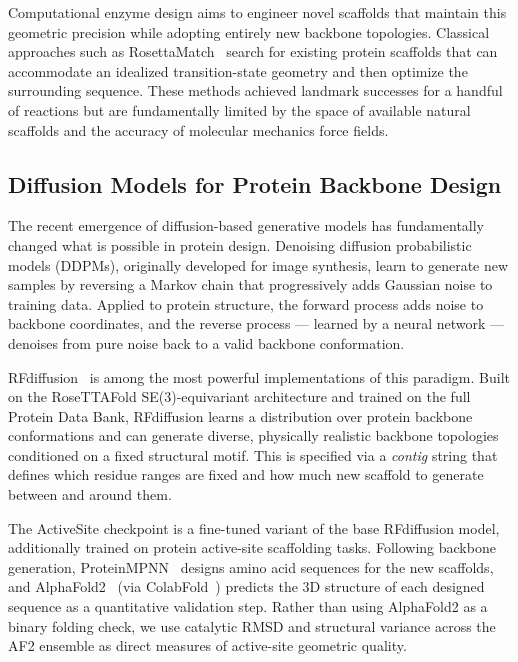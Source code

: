 \documentclass[11pt,letterpaper]{article}
\begin{document}
Computational enzyme design aims to engineer novel scaffolds that maintain this geometric precision while adopting entirely new backbone topologies. Classical approaches such as RosettaMatch~\cite{zanghellini2006} search for existing protein scaffolds that can accommodate an idealized transition-state geometry and then optimize the surrounding sequence. These methods achieved landmark successes for a handful of reactions but are fundamentally limited by the space of available natural scaffolds and the accuracy of molecular mechanics force fields.

\subsection{Diffusion Models for Protein Backbone Design}

The recent emergence of diffusion-based generative models has fundamentally changed what is possible in protein design. Denoising diffusion probabilistic models (DDPMs), originally developed for image synthesis, learn to generate new samples by reversing a Markov chain that progressively adds Gaussian noise to training data. Applied to protein structure, the forward process adds noise to backbone coordinates, and the reverse process — learned by a neural network — denoises from pure noise back to a valid backbone conformation.

RFdiffusion~\cite{watson2023} is among the most powerful implementations of this paradigm. Built on the RoseTTAFold SE(3)-equivariant architecture and trained on the full Protein Data Bank, RFdiffusion learns a distribution over protein backbone conformations and can generate diverse, physically realistic backbone topologies conditioned on a fixed structural motif. This is specified via a \emph{contig} string that defines which residue ranges are fixed and how much new scaffold to generate between and around them.

The ActiveSite checkpoint is a fine-tuned variant of the base RFdiffusion model, additionally trained on protein active-site scaffolding tasks. Following backbone generation, ProteinMPNN~\cite{dauparas2022} designs amino acid sequences for the new scaffolds, and AlphaFold2~\cite{jumper2021} (via ColabFold~\cite{mirdita2022}) predicts the 3D structure of each designed sequence as a quantitative validation step. Rather than using AlphaFold2 as a binary folding check, we use catalytic RMSD and structural variance across the AF2 ensemble as direct measures of active-site geometric quality.
\end{document}
